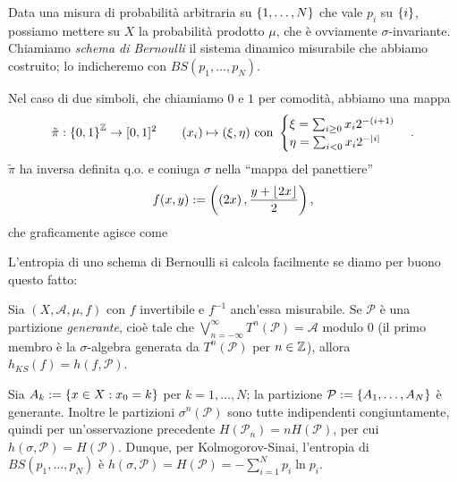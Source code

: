 Data una misura di probabilità arbitraria su $\left\{1,\dots,N\right\}$ che vale $p_i$ su $\left\{i\right\}$, possiamo mettere su $X$
la probabilità prodotto $\mu$, che è ovviamente $\sigma$-invariante. 
Chiamiamo \emph{schema di Bernoulli} il sistema dinamico misurabile che abbiamo costruito; lo indicheremo con $BS(p_1,\dots,p_N)$.

Nel caso di due simboli, che chiamiamo $0$ e $1$ per comodità, abbiamo una mappa 
\[\tilde{\pi}:\left\{0,1\right\}^{\mathbb{Z}}\to [0,1]^2  \qquad (x_i)\mapsto (\xi,\eta) \mbox{ con }  \begin{cases} \xi=\sum_{i\ge 0}x_i 2^{-(i+1)} \\ \eta=\sum_{i<0}x_i 2^{-\left|i\right|}\end{cases}.\] 
$\tilde{\pi}$ ha inversa definita q.o. e coniuga $\sigma$ nella ``mappa del panettiere''
\[ f(x,y):=\left(\left(2x\right),\frac{y+\left\lfloor 2x\right\rfloor}{2}\right), \]
che graficamente agisce come

\begin{center}\end{center}


L'entropia di uno schema di Bernoulli si calcola facilmente se diamo per buono questo fatto:

\begin{teo}Sia $(X,\mathcal{A},\mu,f)$ con $f$ invertibile e $f^{-1}$ anch'essa misurabile.
Se $\mathcal{P}$ è una partizione \emph{generante}, cioè tale che $\bigvee_{n=-\infty}^\infty T^n(\mathcal{P})=\mathcal{A}$ modulo $0$
(il primo membro è la $\sigma$-algebra generata da $T^n(\mathcal{P})$ per $n\in\mathbb{Z}$), allora $h_{KS}(f)=h(f,\mathcal{P})$.
\end{teo}

Sia $A_k:=\left\{x\in X:x_0=k\right\}$ per $k=1,\dots,N$; la partizione $\mathcal{P}:=\left\{A_1,\dots,A_N\right\}$ è generante.
Inoltre le partizioni $\sigma^n(\mathcal{P})$ sono tutte indipendenti congiuntamente, quindi per un'osservazione precedente
$H(\mathcal{P}_n)=nH(\mathcal{P})$, per cui $h(\sigma,\mathcal{P})=H(\mathcal{P})$. Dunque, per Kolmogorov-Sinai, l'entropia di 
$BS(p_1,\dots,p_N)$ è $h(\sigma,\mathcal{P})=H(\mathcal{P})=-\sum_{i=1}^N p_i\ln p_i$.

